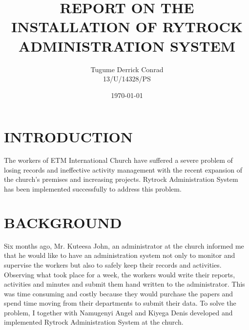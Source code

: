 \documentclass{report}
\begin{document}
\title{REPORT ON THE INSTALLATION OF RYTROCK ADMINISTRATION SYSTEM}
\author{Tugume Derrick Conrad\\13/U/14328/PS}
\date{\today}
\maketitle

\section {INTRODUCTION}

The workers of ETM International Church have suffered a severe problem of losing records and ineffective activity management with the recent expansion of the church’s premises and increasing projects. Rytrock Administration System has been implemented successfully to address this problem.

\section {BACKGROUND}
Six months ago, Mr. Kuteesa John, an administrator at the church informed me that he would like to have an administration system not only to monitor and supervise the workers but also to safely keep their records and activities. Observing what took place for a week, the workers would write their reports, activities and minutes and submit them hand written to the administrator. This was time consuming and costly because they would purchase the papers and spend time moving from their departments to submit their data. To solve the problem, I together with Namugenyi Angel and Kiyega Denis developed and implemented Rytrock Administration System at the church.
\end{document}
